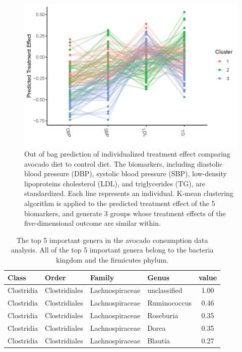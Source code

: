 \documentclass[smallextended]{svjour3}
\begin{document}
\begin{figure}[h]
    \centering
    \includegraphics[width = \textwidth]{Figures/Fig4_AvocadoTreatmentEffect_V3.png}
    \caption{ Out of bag prediction of individualized treatment effect comparing avocado diet to control diet. The biomarkers, including diastolic blood pressure (DBP), systolic blood pressure (SBP), low-density lipoproteins cholesterol (LDL), and triglycerides (TG), are standardized. Each line represents an individual. K-mean clustering algorithm is applied to the predicted treatment effect of the 5 biomarkers, and generate 3 groups whose treatment effects of the five-dimensional outcome are similar within.}\label{AvocadoPlot}
\end{figure}

\begin{table}[h]
    \centering
\begin{tabular}{l l l l c}
\hline
Class & Order & Family & Genus & value\\
\hline
Clostridia & Clostridiales & Lachnospiraceae & unclassified & 1.00\\
Clostridia & Clostridiales & Lachnospiraceae & Ruminococcus & 0.46\\
Clostridia & Clostridiales & Lachnospiraceae & Roseburia & 0.35\\
Clostridia & Clostridiales & Lachnospiraceae & Dorea & 0.35\\
Clostridia & Clostridiales & Lachnospiraceae & Blautia & 0.27\\
\hline
\end{tabular}
\caption{The top 5 important genera in the avocado consumption data analysis. All of the top 5 important genera belong to the bacteria kingdom and the firmicutes phylum.}\label{AvocadoFI}
\end{table}

\clearpage



\end{document}
